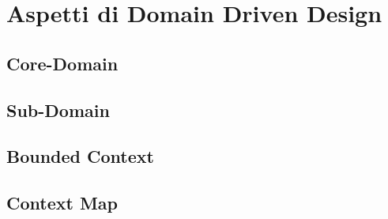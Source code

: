 \section{Aspetti di Domain Driven Design}

\subsection{Core-Domain}
\subsection{Sub-Domain}
\subsection{Bounded Context}
\subsection{Context Map}